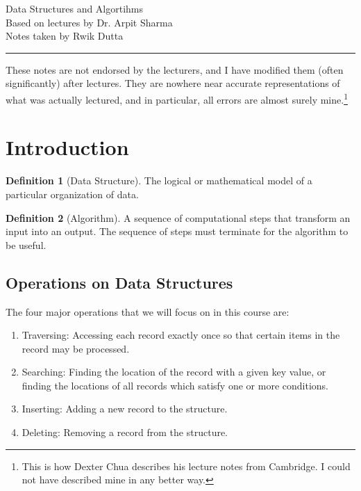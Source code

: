 \documentclass[10pt, a4paper]{extarticle}
\theoremstyle{definition}
\newtheorem{defn}{Definition}
\begin{document}
	\begin{center}
		\fontsize{25}{60}\selectfont Data Structures and Algortihms \\
		\large Based on lectures by Dr. Arpit Sharma\\
		Notes taken by Rwik Dutta
	\end{center}
	\hrule
	\begin{center}
		These notes are not endorsed by the lecturers, and I have modified them (often
significantly) after lectures. They are nowhere near accurate representations of what
was actually lectured, and in particular, all errors are almost surely mine.\footnote[1]{This is how Dexter Chua describes his lecture notes from Cambridge. I could not have described mine in any better way.}
	\end{center}
	\tableofcontents
	
	\newpage
	\section{Introduction}
	\begin{defn}[Data Structure]
		 The logical or mathematical model of a particular organization of data.
	\end{defn}
	\begin{defn}[Algorithm]
		A sequence of computational steps that transform an input into an output. The sequence of steps must terminate for the algorithm to be useful.
	\end{defn}
	\subsection{Operations on Data Structures}
	The four major operations that we will focus on in this course are:
	\begin{enumerate}
		\item Traversing: Accessing each record exactly once so that certain items in the record may be processed.
		\item Searching: Finding the location of the record with a given key value, or finding the locations of all records which satisfy one or more conditions.
		\item Inserting: Adding a new record to the structure.
		\item Deleting: Removing a record from the structure.
\end{enumerate}
\end{document}
